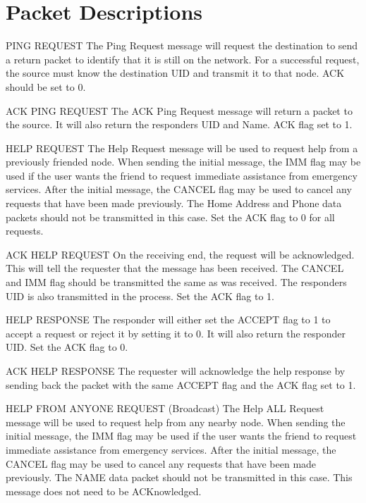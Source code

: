 \documentclass[journal,compsoc]{IEEEtran}
\begin{document}
\section{Packet Descriptions}
\label{Packet Descriptions}
\begin{LaTeXdescription}
  \item[PING REQUEST]
  The Ping Request message will request the destination to send a return packet to identify that it is still on the network. For a successful request, the source must know the destination UID and transmit it to that node.
  ACK should be set to 0.
  \item[ACK PING REQUEST]
  The ACK Ping Request message will return a packet to the source. It will also return the responders UID and Name.
  ACK flag set to 1.
  \item[HELP REQUEST]
  The Help Request message will be used to request help from a previously friended node. When sending the initial message, the IMM flag may be used if the user wants the friend to request immediate assistance from emergency services.
  After the initial message, the CANCEL flag may be used to cancel any requests that have been made previously. The Home Address and Phone data packets should not be transmitted in this case.
  Set the ACK flag to 0 for all requests.
  \item[ACK HELP REQUEST]
  On the receiving end, the request will be acknowledged. This will tell the requester that the message has been received. The CANCEL and IMM flag should be transmitted the same as was received. The responders UID is also transmitted in the process.
  Set the ACK flag to 1.
  \item[HELP RESPONSE]
  The responder will either set the ACCEPT flag to 1 to accept a request or reject it by setting it to 0. It will also return the responder UID. 
  Set the ACK flag to 0.
  \item[ACK HELP RESPONSE]
  The requester will acknowledge the help response by sending back the packet with the same ACCEPT flag and the ACK flag set to 1.
  \item[HELP FROM ANYONE REQUEST (Broadcast)]
  The Help ALL Request message will be used to request help from any nearby node. When sending the initial message, the IMM flag may be used if the user wants the friend to request immediate assistance from emergency services.
  After the initial message, the CANCEL flag may be used to cancel any requests that have been made previously. The NAME data packet should not be transmitted in this case.
  This message does not need to be ACKnowledged.

\end{LaTeXdescription}
\end{document}
